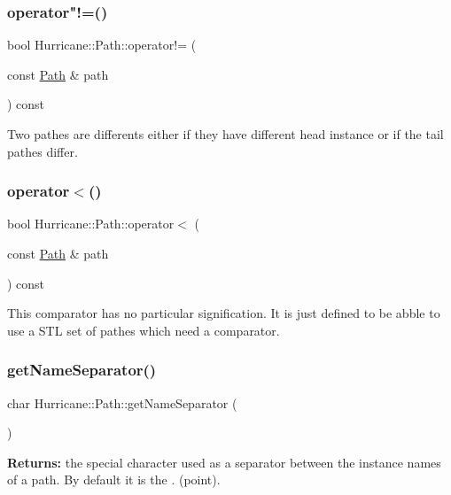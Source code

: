 \subsubsection{\texorpdfstring{operator"!=()}{operator!=()}}
{\footnotesize\ttfamily bool Hurricane\+::\+Path\+::operator!= (\begin{DoxyParamCaption}\item[{const \hyperlink{classHurricane_1_1Path}{Path} \&}]{path }\end{DoxyParamCaption}) const}

Two pathes are differents either if they have different head instance or if the tail pathes differ. \mbox{\label{classHurricane_1_1Path_a5bf33d2d9e3e7d46db770e26c09be90b}} 
\subsubsection{\texorpdfstring{operator$<$()}{operator<()}}
{\footnotesize\ttfamily bool Hurricane\+::\+Path\+::operator$<$ (\begin{DoxyParamCaption}\item[{const \hyperlink{classHurricane_1_1Path}{Path} \&}]{path }\end{DoxyParamCaption}) const}

This comparator has no particular signification. It is just defined to be abble to use a S\+TL set of pathes which need a comparator. \mbox{\label{classHurricane_1_1Path_ac63015239df43b8c44a6d74a262eb3a2}} 
\subsubsection{\texorpdfstring{get\+Name\+Separator()}{getNameSeparator()}}
{\footnotesize\ttfamily char Hurricane\+::\+Path\+::get\+Name\+Separator (\begin{DoxyParamCaption}{ }\end{DoxyParamCaption})\hspace{0.3cm}{\ttfamily [static]}}

{\bfseries Returns\+:} the special character used as a separator between the instance names of a path. By default it is the \textquotesingle{}.\textquotesingle{} (point). \mbox{\label{classHurricane_1_1Path_afddde635f302cee0a215ca364e9689b5}} 
